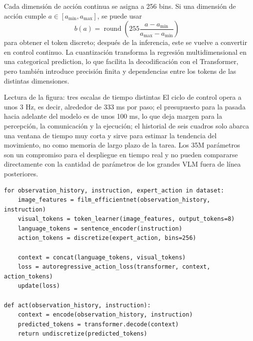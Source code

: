 Cada dimensión de acción continua se asigna a 256 bins. Si una dimensión de acción cumple $a\in[a_{\min},a_{\max}]$, se puede usar
\begin{equation}
b(a)=\operatorname{round}\left(
255\frac{a-a_{\min}}{a_{\max}-a_{\min}}
\right)
\end{equation}
para obtener el token discreto; después de la inferencia, este se vuelve a convertir en control continuo. La cuantización transforma la regresión multidimensional en una categorical prediction, lo que facilita la decodificación con el Transformer, pero también introduce precisión finita y dependencias entre los tokens de las distintas dimensiones.


\begin{knowledgebox}{Lectura de la figura: tres escalas de tiempo distintas}
El ciclo de control opera a unos 3 Hz, es decir, alrededor de 333 ms por paso; el presupuesto para la pasada hacia adelante del modelo es de unos 100 ms, lo que deja margen para la percepción, la comunicación y la ejecución; el historial de seis cuadros solo abarca una ventana de tiempo muy corta y sirve para estimar la tendencia del movimiento, no como memoria de largo plazo de la tarea. Los 35M parámetros son un compromiso para el despliegue en tiempo real y no pueden compararse directamente con la cantidad de parámetros de los grandes VLM fuera de línea posteriores.
\end{knowledgebox}


\begin{lstlisting}[caption={RT-1-style tokenized imitation loop},label={lst:rt1-loop}]
for observation_history, instruction, expert_action in dataset:
    image_features = film_efficientnet(observation_history, instruction)
    visual_tokens = token_learner(image_features, output_tokens=8)
    language_tokens = sentence_encoder(instruction)
    action_tokens = discretize(expert_action, bins=256)

    context = concat(language_tokens, visual_tokens)
    loss = autoregressive_action_loss(transformer, context, action_tokens)
    update(loss)

def act(observation_history, instruction):
    context = encode(observation_history, instruction)
    predicted_tokens = transformer.decode(context)
    return undiscretize(predicted_tokens)
\end{lstlisting}

